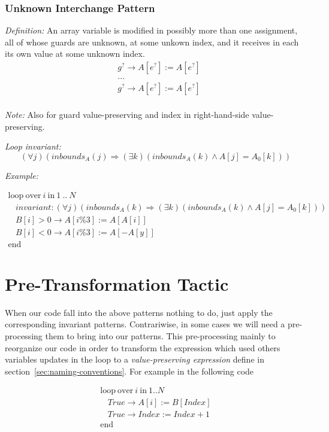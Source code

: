 \documentclass[a4paper,10pt]{article}
\newcommand{\KWloop}{\ensuremath{\mathrm{loop}~}}
\newcommand{\KWend}{\ensuremath{\mathrm{end}~}}
\newcommand{\KWover}{\ensuremath{\mathrm{over}~}}
\newcommand{\KWin}{\ensuremath{~\mathrm{in}~}}
\newcommand{\impl}{\ensuremath{\Longrightarrow}}
\newcommand{\inbounds}[2]{\ensuremath{\mathit{inbounds}_{#1}(#2)}\xspace}
\newcommand{\loopinvariant}{\noindent\textit{Loop invariant:}\xspace}
\newcommand{\patterndef}{\noindent\textit{Definition:}\xspace}
\newcommand{\patternexample}{\noindent\textit{Example:}\xspace}
\newcommand{\patternnote}{\noindent\textit{Note:}\xspace}
\begin{document}
\subsubsection*{Unknown Interchange Pattern}

\patterndef An array variable is modified in possibly more than one assignment,
all of whose guards are unknown, at some unkown index, and it receives in each
its own value at some unknown index.
%
\begin{eqnarray*}
&g^? \rightarrow A[e^?] := A[e^?]\\
&...\\
&g^? \rightarrow A[e^?] := A[e^?]\\
\end{eqnarray*}

\patternnote Also for guard value-preserving and index in right-hand-side value-preserving.

\medskip
\loopinvariant
%
$$(\forall j)(\inbounds{A}{j} \impl (\exists k)(\inbounds{A}{k} \land A[j] = A_0[k])) $$

\bigskip
\patternexample

\medskip
$\begin{array}{l}
  \KWloop \KWover i \KWin 1~..~N \\
  ~~~~ \textit{invariant}: (\forall j)(\inbounds{A}{k} \impl (\exists k)(\inbounds{A}{k} \land A[j] = A_0[k]))\\
  ~~~~ B[i] > 0 \rightarrow A[i\%3] := A[A[i]]\\
  ~~~~ B[i] < 0 \rightarrow A[i\%3] := A[-A[y]]\\
  \KWend
\end{array}$

\section{Pre-Transformation Tactic}
When our code fall into the above patterns nothing to do, just apply the corresponding invariant patterns. 
Contrariwise, in some cases we will need a pre-processing them to bring into our patterns. 
This pre-processing mainly to reorganize our code in order to transform the expression 
which used others variables updates in the loop to a \textit{value-preserving expression}  
define in section~\ref{sec:naming-conventions}. For example in the following code 

$$\begin{array}{l}
  \KWloop \KWover i \KWin 1 .. N \\
  ~~~~ True \rightarrow A[i] := B[Index]\\
  ~~~~ True \rightarrow Index := Index + 1\\
  \KWend
\end{array}$$
\end{document}
